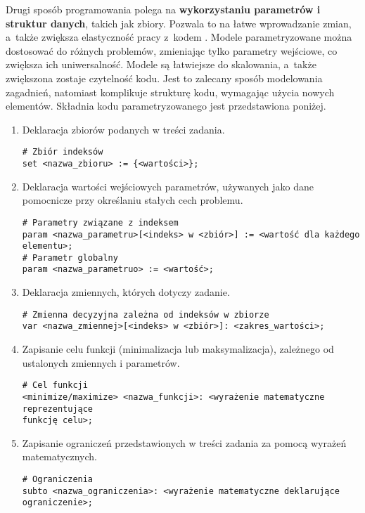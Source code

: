 Drugi sposób programowania polega na \textbf{wykorzystaniu parametrów i struktur danych}, takich jak zbiory. Pozwala to na łatwe wprowadzanie zmian, a~także zwiększa elastyczność pracy z~kodem . Modele parametryzowane można dostosować do różnych problemów, zmieniając tylko parametry wejściowe, co zwiększa ich uniwersalność. Modele są łatwiejsze do skalowania, a~także zwiększona zostaje czytelność kodu. Jest to zalecany sposób modelowania zagadnień, natomiast komplikuje strukturę kodu, wymagając użycia nowych elementów. %
Składnia kodu parametryzowanego jest przedstawiona poniżej.

\begin{enumerate}
\item Deklaracja zbiorów podanych w treści zadania.

\begin{lstlisting}[language=zimpl]
# Zbiór indeksów
set <nazwa_zbioru> := {<wartości>};
\end{lstlisting}

\item Deklaracja wartości wejściowych parametrów, używanych jako dane pomocnicze przy określaniu stałych cech problemu.

\begin{lstlisting}[language=zimpl]
# Parametry związane z indeksem
param <nazwa_parametru>[<indeks> w <zbiór>] := <wartość dla każdego elementu>;
# Parametr globalny
param <nazwa_parametruo> := <wartość>;
\end{lstlisting}

\item Deklaracja zmiennych, których dotyczy zadanie.

\begin{lstlisting}[language=zimpl]
# Zmienna decyzyjna zależna od indeksów w zbiorze
var <nazwa_zmiennej>[<indeks> w <zbiór>]: <zakres_wartości>;
\end{lstlisting}

\item Zapisanie celu funkcji (minimalizacja lub maksymalizacja), zależnego od ustalonych zmiennych i parametrów.

\begin{lstlisting}[language=zimpl]
# Cel funkcji
<minimize/maximize> <nazwa_funkcji>: <wyrażenie matematyczne reprezentujące
funkcję celu>;
\end{lstlisting}

\item Zapisanie ograniczeń przedstawionych w treści zadania za pomocą wyrażeń matematycznych.

\begin{lstlisting}[language=zimpl]
# Ograniczenia
subto <nazwa_ograniczenia>: <wyrażenie matematyczne deklarujące ograniczenie>;
\end{lstlisting}
\end{enumerate}

